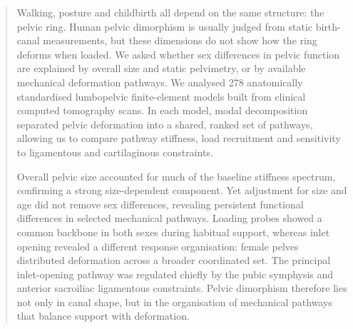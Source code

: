 \documentclass[openacc]{rsproca_new}
\begin{document}
\begin{abstract}
Walking, posture and childbirth all depend on the same structure: the pelvic ring. Human pelvic dimorphism is usually judged from static birth-canal measurements, but these dimensions do not show how the ring deforms when loaded. We asked whether sex differences in pelvic function are explained by overall size and static pelvimetry, or by available mechanical deformation pathways. We analysed 278 anatomically standardised lumbopelvic finite-element models built from clinical computed tomography scans. In each model, modal decomposition separated pelvic deformation into a shared, ranked set of pathways, allowing us to compare pathway stiffness, load recruitment and sensitivity to ligamentous and cartilaginous constraints.

Overall pelvic size accounted for much of the baseline stiffness spectrum, confirming a strong size-dependent component. Yet adjustment for size and age did not remove sex differences, revealing persistent functional differences in selected mechanical pathways. Loading probes showed a common backbone in both sexes during habitual support, whereas inlet opening revealed a different response organisation: female pelves distributed deformation across a broader coordinated set. The principal inlet-opening pathway was regulated chiefly by the pubic symphysis and anterior sacroiliac ligamentous constraints. Pelvic dimorphism therefore lies not only in canal shape, but in the organisation of mechanical pathways that balance support with deformation.



\end{abstract}
\end{document}
